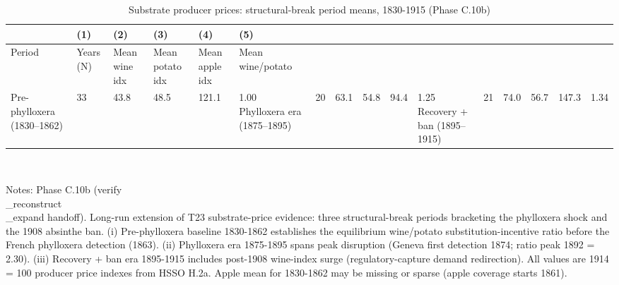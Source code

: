 \documentclass{article}
\begin{document}
\begin{table}[tbp] \centering
{}

\caption{Substrate producer prices: structural-break period means, 1830-1915 (Phase C.10b)}
\label{tab:substrate_prices_periods}
\begin{tabularx}{\linewidth}{@{}lCCCCC@{}}

\toprule
&{(1)}&{(2)}&{(3)}&{(4)}&{(5)} \tabularnewline \midrule
{Period}&{Years (N)}&{Mean wine idx}&{Mean potato idx}&{Mean apple idx}&{Mean wine/potato} \tabularnewline
\midrule \addlinespace[\belowrulesep]
Pre-phylloxera (1830--1862)&33&43.8&48.5&121.1&1.00
Phylloxera era (1875--1895)&20&63.1&54.8&94.4&1.25
Recovery + ban (1895--1915)&21&74.0&56.7&147.3&1.34
\bottomrule \addlinespace[\belowrulesep]

\end{tabularx}
\\ \parbox{\linewidth}{\footnotesize Notes: Phase C.10b (verify\\_reconstruct\\_expand handoff). Long-run extension of T23 substrate-price evidence: three structural-break periods bracketing the phylloxera shock and the 1908 absinthe ban. (i) Pre-phylloxera baseline 1830-1862 establishes the equilibrium wine/potato substitution-incentive ratio before the French phylloxera detection (1863). (ii) Phylloxera era 1875-1895 spans peak disruption (Geneva first detection 1874; ratio peak 1892 = 2.30). (iii) Recovery + ban era 1895-1915 includes post-1908 wine-index surge (regulatory-capture demand redirection). All values are 1914 = 100 producer price indexes from HSSO H.2a. Apple mean for 1830-1862 may be missing or sparse (apple coverage starts 1861).}
\end{table}
\end{document}
